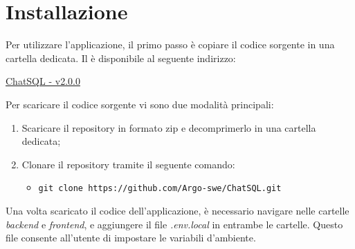 \section{Installazione}

\par Per utilizzare l'applicazione, il primo passo è copiare il codice sorgente in una cartella dedicata. Il  è disponibile al seguente indirizzo:

\quad \href{https://github.com/Argo-swe/ChatSQL/tree/v2.0.0}{ChatSQL - v2.0.0} \newline

\par Per scaricare il codice sorgente vi sono due modalità principali:
\begin{enumerate}
  \item Scaricare il repository in formato zip e decomprimerlo in una cartella dedicata;
  \item Clonare il repository tramite il seguente comando:
  \begin{itemize} 
    \item \texttt{git clone https://github.com/Argo-swe/ChatSQL.git}
  \end{itemize}
\end{enumerate}

\vspace{0.5\baselineskip}
\par Una volta scaricato il codice dell'applicazione, è necessario navigare nelle cartelle \textit{backend} e \textit{frontend}, e aggiungere il file \textit{.env.local} in entrambe le cartelle. Questo file consente all'utente di impostare le variabili d'ambiente.